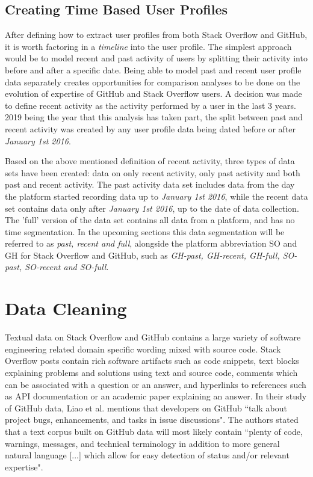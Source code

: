     \subsection{Creating Time Based User Profiles\label{past_recent_full_segm}}
        After defining how to extract user profiles from both Stack Overflow and GitHub, it is worth factoring in a \textit{timeline} into the user profile. The simplest approach would be to model recent and past activity of users by splitting their activity into before and after a specific date. Being able to model past and recent user profile data separately creates opportunities for comparison analyses to be done on the evolution of expertise of GitHub and Stack Overflow users. A decision was made to define recent activity as the activity performed by a user in the last 3 years. 2019 being the year that this analysis has taken part, the split between past and recent activity was created by any user profile data being dated before or after \textit{January 1st 2016}.
        
        Based on the above mentioned definition of recent activity, three types of data sets have been created: data on only recent activity, only past activity and both past and recent activity. The past activity data set includes data from the day the platform started recording data up to \textit{January 1st 2016}, while the recent data set contains data only after \textit{January 1st 2016}, up to the date of data collection. The 'full' version of the data set contains all data from a platform, and has no time segmentation. In the upcoming sections this data segmentation will be referred to as \emph{past, recent and full}, alongside the platform abbreviation SO and GH for Stack Overflow and GitHub, such as \emph{GH-past, GH-recent, GH-full, SO-past, SO-recent and SO-full}.

\section{Data Cleaning\label{data_cleaning}}

    Textual data on Stack Overflow and GitHub contains a large variety of software engineering related domain specific wording mixed with source code. Stack Overflow posts contain rich software artifacts such as code snippets, text blocks explaining problems and solutions using text and source code, comments which can be associated with a question or an answer, and hyperlinks to references such as API documentation or an academic paper explaining an answer. In their study of GitHub data, Liao et al. \cite{liao2019status} mentions that developers on GitHub ``talk about project bugs, enhancements, and tasks in issue discussions". The authors stated that a text corpus built on GitHub data will most likely contain ``plenty of code, warnings, messages, and technical terminology in addition to more general natural language [...] which allow for easy detection of status and/or relevant expertise".
    
